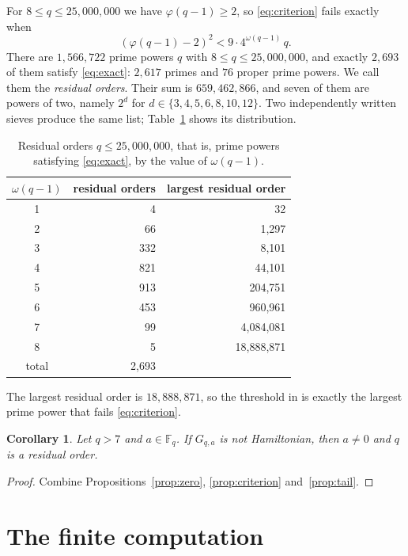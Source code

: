 \documentclass{amsart}
\newtheorem{corollary}[theorem]{Corollary}
\theoremstyle{remark}
\numberwithin{equation}{section}
\numberwithin{table}{section}
\newcommand{\F}{\mathbb{F}}
\begin{document}
For $8\le q\le 25{,}000{,}000$ we have $\varphi(q-1)\ge2$, so \eqref{eq:criterion} fails exactly when
\begin{equation}\label{eq:exact}
(\varphi(q-1)-2)^{2}<9\cdot 4^{\omega(q-1)}\,q .
\end{equation}
There are $1{,}566{,}722$ prime powers $q$ with $8\le q\le 25{,}000{,}000$, and exactly $2{,}693$ of them satisfy \eqref{eq:exact}: $2{,}617$ primes and $76$ proper prime powers. We call them the \emph{residual orders}. Their sum is $659{,}462{,}866$, and seven of them are powers of two, namely $2^{d}$ for $d\in\{3,4,5,6,8,10,12\}$. Two independently written sieves produce the same list; Table~\ref{tab:residual} shows its distribution.

\begin{table}[ht]
\caption{Residual orders $q\le 25{,}000{,}000$, that is, prime powers satisfying \eqref{eq:exact}, by the value of $\omega(q-1)$.}\label{tab:residual}
\centering
\begin{tabular}{@{}crr@{}}
\toprule
$\omega(q-1)$ & residual orders & largest residual order\\
\midrule
1 & 4 & 32\\
2 & 66 & 1{,}297\\
3 & 332 & 8{,}101\\
4 & 821 & 44{,}101\\
5 & 913 & 204{,}751\\
6 & 453 & 960{,}961\\
7 & 99 & 4{,}084{,}081\\
8 & 5 & 18{,}888{,}871\\
\midrule
total & 2{,}693 & \\
\bottomrule
\end{tabular}
\end{table}

The largest residual order is $18{,}888{,}871$, so the threshold in \cite[Theorem~1.2]{LS} is exactly the largest prime power that fails \eqref{eq:criterion}.

\begin{corollary}\label{cor:finite}
Let $q>7$ and $a\in\F_q$. If $G_{q,a}$ is not Hamiltonian, then $a\neq0$ and $q$ is a residual order.
\end{corollary}

\begin{proof}
Combine Propositions~\ref{prop:zero}, \ref{prop:criterion} and~\ref{prop:tail}.
\end{proof}

\section{The finite computation}\label{sec:computation}
\end{document}
